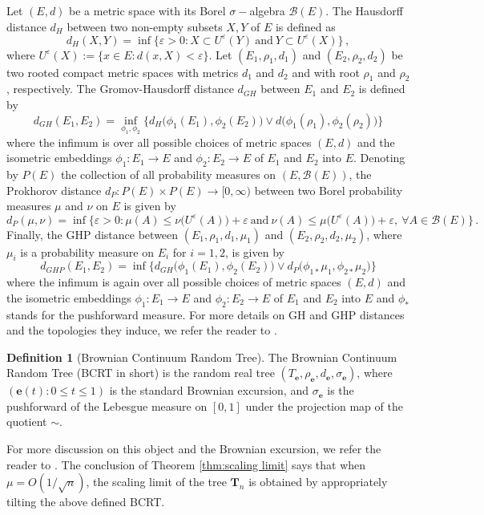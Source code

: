 \documentclass{article}
\newcommand{\1}{\mathbbm{1}}								%
\theoremstyle{definition}
\newtheorem{definition}[theorem]{Definition}
\numberwithin{equation}{section}
\begin{document}
Let $(E,d)$ be a metric space with its Borel $\sigma-$algebra $\mathcal{B}(E)$. The Hausdorff distance $d_H$ between two non-empty subsets $X,Y$ of $E$ is defined as
$$
d_H(X,Y) = \inf \Big\{ \varepsilon>0 : X \subset U^\varepsilon(Y)~ \text{and} ~Y \subset U^\varepsilon(X) \Big\}\,,$$
where $U^\varepsilon(X) := \{x\in E: d(x,X)<\varepsilon \}$.
Let $(E_1,\rho_1,d_1)$ and $(E_2,\rho_2,d_2)$ be two {rooted} compact metric spaces with metrics $d_1$ and $d_2$ and with {root} $\rho_1$ and $\rho_2$, respectively. The Gromov-Hausdorff distance $d_{GH}$ between $E_1$ and $E_2$ is defined by
$$ d_{GH}(E_1,E_2)=\inf_{\phi_1,\phi_2} \Big\{d_H\big(\phi_1(E_1),\phi_2(E_2)\big) \vee d\big(\phi_1(\rho_1),\phi_2(\rho_2)\big)\Big\}$$ where the infimum is over all possible choices of metric spaces $({E},{d})$ and the isometric embeddings $\phi_1:E_1 \to E$ and $\phi_2:E_2 \to E$ of $E_1$ and $E_2$ into ${E}.$
Denoting by $P(E)$ the collection of all probability measures on $(E,\mathcal B (E))$, the Prokhorov distance $d_P: P(E) \times P(E) \to [0, \infty)$ between two Borel probability measures $\mu$ and $\nu$ on $E$ is given by
$$
d_P(\mu,\nu)= \inf \Big\{ \varepsilon>0 : \mu(A) \leq \nu \big(U^\varepsilon(A)\big) + \varepsilon ~\text{and} ~\nu(A) \leq \mu\big(U^\varepsilon(A)\big) + \varepsilon , ~\forall A \in \mathcal B (E) \Big\} \, .$$
Finally, the GHP distance between $(E_1,\rho_1,d_1,\mu_1)$ and $(E_2,\rho_2,d_2,\mu_2)$, where $\mu_i$ is a probability measure on $E_i$ for $i=1,2$, is given by
$$ d_{GHP} (E_1,E_2) = \inf \Big\{ d_{GH}\big(\phi_1(E_1) , \phi_2(E_2)\big) \vee d_P\big(\phi_{1*} \mu_1 , \phi_{2*} \mu_2\big) \Big\}$$
where the infimum is again over all possible choices of metric spaces $({E},{d})$ and the isometric embeddings $\phi_1:E_1 \to E$ and $\phi_2:E_2 \to E$ of $E_1$ and $E_2$ into ${E}$ and $\phi_*$ stands for the pushforward measure. For more details on GH and GHP distances and the topologies they induce, we refer the reader to \cite{burago2001course, miermont2013brownian, gall2011scaling}.

\begin{definition}[Brownian Continuum Random Tree]
    The Brownian Continuum Random Tree (BCRT in short) \cite{aldous1991continuum} is the random real tree $(T_{\mathbf{e}},\rho_{\mathbf{e}},d_{\mathbf{e}},\sigma_{\mathbf{e}})$, where $(\mathbf{e}(t):0\leq t\leq 1)$ is the standard Brownian excursion, and $\sigma_{\mathbf{e}}$ is the pushforward of the Lebesgue measure on $[0,1]$ under the projection map of the quotient $\sim$.
\end{definition}
For more discussion on this object and the Brownian excursion, we refer the reader to \cite{duquesne2002random}. The conclusion of Theorem \ref{thm:scaling limit} says that when $\mu=O(1/\sqrt{n})$, the scaling limit of the tree $\mathbf{T}_n$ is obtained by appropriately tilting the above defined BCRT.
\end{document}
